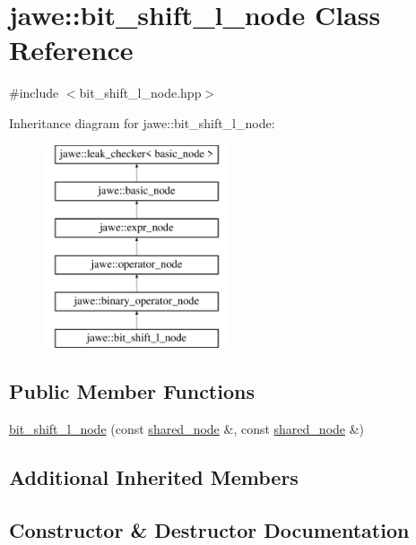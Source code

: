 \hypertarget{classjawe_1_1bit__shift__l__node}{}\section{jawe\+:\+:bit\+\_\+shift\+\_\+l\+\_\+node Class Reference}
\label{classjawe_1_1bit__shift__l__node}


{\ttfamily \#include $<$bit\+\_\+shift\+\_\+l\+\_\+node.\+hpp$>$}

Inheritance diagram for jawe\+:\+:bit\+\_\+shift\+\_\+l\+\_\+node\+:\begin{figure}[H]
\begin{center}
\leavevmode
\includegraphics[height=6.000000cm]{classjawe_1_1bit__shift__l__node}
\end{center}
\end{figure}
\subsection*{Public Member Functions}
\begin{DoxyCompactItemize}
\item 
\hyperlink{classjawe_1_1bit__shift__l__node_aceb090920d486ee66b9dce574e72075c}{bit\+\_\+shift\+\_\+l\+\_\+node} (const \hyperlink{namespacejawe_a3f307481d921b6cbb50cc8511fc2b544}{shared\+\_\+node} \&, const \hyperlink{namespacejawe_a3f307481d921b6cbb50cc8511fc2b544}{shared\+\_\+node} \&)
\end{DoxyCompactItemize}
\subsection*{Additional Inherited Members}


\subsection{Constructor \& Destructor Documentation}
\mbox{\label{classjawe_1_1bit__shift__l__node_aceb090920d486ee66b9dce574e72075c}} 
